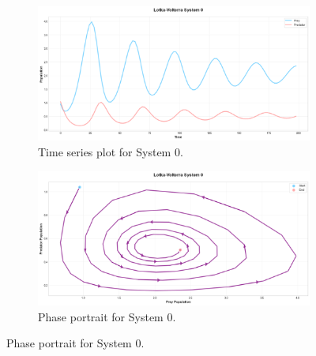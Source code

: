 \documentclass{article}
\begin{document}
\begin{figure}[!htbp] %
    \centering %

    \begin{subfigure}[b]{0.4\linewidth} %
        \centering
        \includegraphics[width=\linewidth]{M2 Course Work//Images/dataset_vis_timeseries_0.png}
        \caption{Time series plot for System 0.}
        \label{fig:ts_0}
    \end{subfigure}
    \hfill %
    \begin{subfigure}[b]{0.4\linewidth}
        \centering
        \includegraphics[width=\linewidth]{M2 Course Work//Images/dataset_vis_phase_0.png}
        \caption{Phase portrait for System 0.}
        \label{fig:phase_0}
    \end{subfigure}

    \vspace{0.2cm} %


\end{figure}
\end{document}

